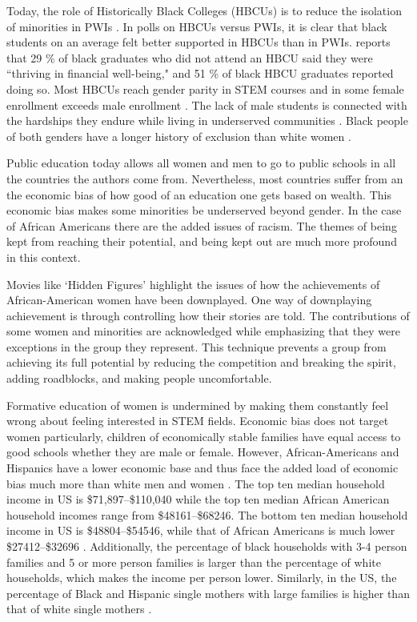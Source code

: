\documentclass[utf8]{frontiersSCNS} %
\begin{document}
Today, the role of Historically Black Colleges (HBCUs) is to reduce the isolation of minorities in PWIs \citep{reid2012women}. In polls on HBCUs versus PWIs, it is clear that black students on an average felt better supported in HBCUs than in PWIs. \cite{seymour2015grads} reports that 29 \% of black graduates who did not attend an HBCU said they were ``thriving in financial well-being,"  and 51 \% of black HBCU graduates reported doing so. Most HBCUs reach gender parity in STEM courses and in some female enrollment exceeds male enrollment \citep{simms2014educational}. The lack of male students is connected with the hardships they endure while living in underserved communities \citep{cuyjet1997african,white2013black}. Black people of both genders have a longer history of exclusion than white women \citep{hine1997hine}.

Public education today allows all women and men to go to public schools in all the countries the authors come from. Nevertheless, most countries suffer from an the economic bias of how good of an education one gets based on wealth. This economic bias makes some minorities be underserved beyond gender. In the case of African Americans there are the added issues of racism. The themes of being kept from reaching their potential, and being kept out are much more profound in this context. 

Movies like ‘Hidden Figures’ highlight the issues of how the achievements of African-American women have been downplayed. One way of downplaying achievement is through controlling how their stories are told.  The contributions of some women and minorities are acknowledged while emphasizing that they were exceptions in the group they represent. This technique prevents a group from achieving its full potential by reducing the competition and breaking the spirit, adding roadblocks, and making people uncomfortable. 

Formative education of women is undermined by making them constantly feel wrong about feeling interested in STEM fields. Economic bias does not target women particularly, children of economically stable families have equal access to good schools whether they are male or female. However, African-Americans and Hispanics have a lower economic base and thus face the added load of economic bias much more than white men and women \citep{BlackIncome}. The top ten median household income in US is \$71,897--\$110,040 while the top ten median African American household incomes range from \$48161--\$68246. The bottom ten median household income in US  is \$48804--\$54546, while that of African Americans is much lower \$27412--\$32696 \citep{BlackEco1}.
Additionally, the percentage of black households with 3-4 person families and 5 or more person families is larger than the percentage of white households, which makes the income per person lower. Similarly, in the US, the percentage of Black and Hispanic single mothers with large families is higher than that of white single mothers \citep{BlackFam}.
\end{document}
